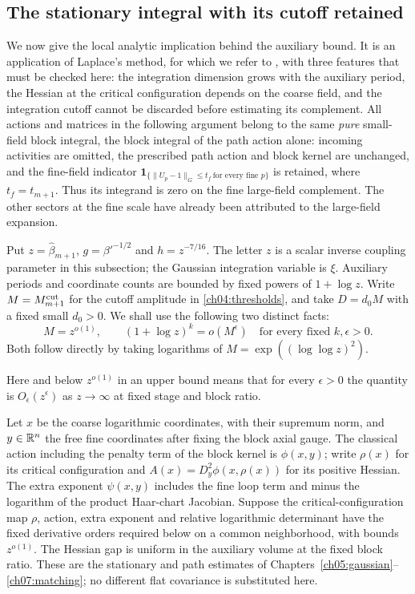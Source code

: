 \subsection{The stationary integral with its cutoff retained}
\label{ch09:stationary-remainder}

We now give the local analytic implication behind the auxiliary bound.
It is an application of Laplace's method, for which we refer to
\cite[Chapter II]{Wong2001}, with three features that must be checked
here: the integration dimension grows with the auxiliary period, the
Hessian at the critical configuration depends on the coarse field, and the integration
cutoff cannot be discarded before estimating its complement.
All actions and matrices in the following argument belong to the same
\emph{pure} small-field block integral, the block integral of the path action alone: incoming activities are omitted, the
prescribed path action and block kernel are unchanged, and the fine-field
indicator $\mathbf1_{\{\|U_p-1\|_G\le t_f\ \text{for every fine }p\}}$
is retained, where $t_f=t_{m+1}$. Thus its integrand is zero on the fine large-field
complement. The other sectors at the fine scale have already been attributed to the
large-field expansion.

Put $z=\widehat\beta_{m+1}$, $g=\beta'^{-1/2}$ and
$h=z^{-7/16}$. The letter $z$ is a scalar inverse coupling parameter in this
subsection; the Gaussian integration variable is $\xi$. Auxiliary
periods and coordinate counts are bounded by fixed powers of
$1+\log z$. Write $M=M_{m+1}^{\rm cut}$ for the cutoff amplitude
in \eqref{ch04:thresholds}, and take $D=d_0M$ with a fixed small
$d_0>0$. We shall use the following two distinct facts:
\[
 M=z^{o(1)},\qquad (1+\log z)^k=o(M^\epsilon)
 \quad\text{for every fixed }k,\epsilon>0.
\]
Both follow directly by taking logarithms of
$M=\exp((\log\log z)^2)$.

Here and below $z^{o(1)}$ in an upper bound means that for every
$\epsilon>0$ the quantity is $O_\epsilon(z^\epsilon)$ as $z\to\infty$
at fixed stage and block ratio.

Let $x$ be the coarse logarithmic coordinates, with their supremum
norm, and $y\in\mathbb R^n$ the free fine coordinates after fixing the block axial
gauge. The classical action including the penalty term of the block kernel is
$\phi(x,y)$; write $\rho(x)$ for its critical configuration and
$A(x)=D_y^2\phi(x,\rho(x))$ for its positive Hessian.
The extra exponent $\psi(x,y)$ includes the fine loop term and minus
the logarithm of the product Haar-chart Jacobian. Suppose the critical-configuration map $\rho$,
action, extra exponent and relative logarithmic determinant have the
fixed derivative orders required below on a common neighborhood,
with bounds $z^{o(1)}$. The Hessian gap is uniform in the auxiliary
volume at the fixed block ratio. These are the stationary and path
estimates of Chapters~\ref{ch05:gaussian}--\ref{ch07:matching}; no
different flat covariance is substituted here.


